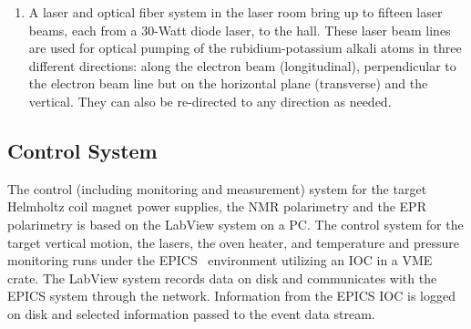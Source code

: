 \begin{enumerate}
\item 
A laser and optical fiber system in the laser room bring 
up to fifteen laser beams, each from 
a 30-Watt diode laser, to the hall. 
These laser beam lines are used for optical
pumping of the rubidium-potassium alkali atoms in three different directions:
along the electron beam (longitudinal), perpendicular to the electron
beam line but on the horizontal plane (transverse) and the vertical. They can 
also be re-directed to any direction as needed.
\end{enumerate} 


\subsection{Control System}

The control (including monitoring and measurement) system for
the target Helmholtz coil magnet power supplies, the NMR polarimetry
and the EPR polarimetry is based on the LabView system on a PC.
The control system for the target vertical motion, the lasers,
the oven heater, and temperature and pressure monitoring
runs under the EPICS~\cite{EPICSwww} environment utilizing
 an IOC in a VME crate. The LabView system 
records data on disk and communicates with the 
EPICS system through the network. Information from the EPICS IOC is logged 
on disk and selected information passed to the event data stream.

